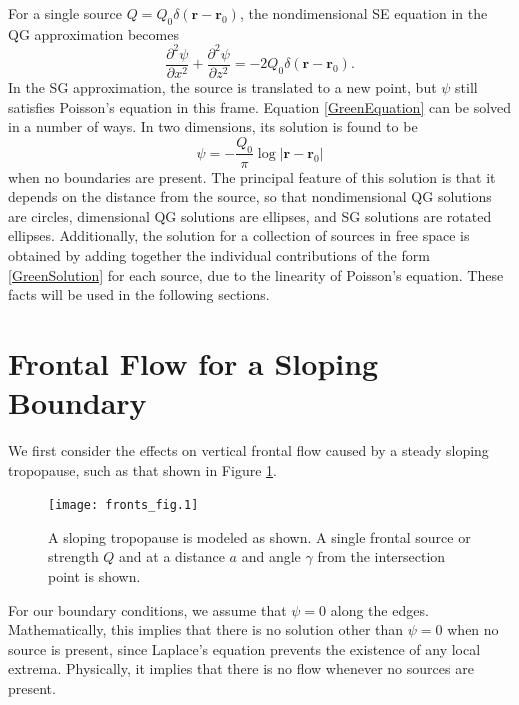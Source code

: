 \documentclass[11pt,onecolumn,oneside]{article}
\newcommand{\pdiff}[2]{\frac{\partial #1}{\partial #2}}
\begin{document}
For a single source $Q = Q_0 \delta(\mathbf{r} - \mathbf{r}_0)$, the nondimensional SE equation in the QG approximation becomes
\begin{equation}\label{GreenEquation}
\pdiff{^2 \psi}{x^2} + \pdiff{^2 \psi}{z^2} = -2Q_0 \delta(\mathbf{r} - \mathbf{r}_0).
\end{equation}
In the SG approximation, the source is translated to a new point, but $\psi$ still satisfies Poisson's equation in this frame. Equation \eqref{GreenEquation} can be solved in a number of ways. In two dimensions, its solution is found to be
\begin{equation}\label{GreenSolution}
\psi = -\frac{Q_0}{\pi} \log |\mathbf{r} - \mathbf{r}_0|
\end{equation}
when no boundaries are present. The principal feature of this solution is that it depends on the distance from the source, so that nondimensional QG solutions are circles, dimensional QG solutions are ellipses, and SG solutions are rotated ellipses. Additionally, the solution for a collection of sources in free space is obtained by adding together the individual contributions of the form \eqref{GreenSolution} for each source, due to the linearity of Poisson's equation. These facts will be used in the following sections.


\section{Frontal Flow for a Sloping Boundary}

We first consider the effects on vertical frontal flow caused by a steady sloping tropopause, such as that shown in Figure \ref{Fig:SlopedDomain}.
\begin{figure}[ht]
\centering
\texttt{[image: fronts\_fig.1]}
\caption{\small A sloping tropopause is modeled as shown. A single frontal source or strength $Q$ and at a distance $a$ and angle $\gamma$ from the intersection point is shown.}
\label{Fig:SlopedDomain}
\end{figure}
For our boundary conditions, we assume that $\psi = 0$ along the edges. Mathematically, this implies that there is no solution other than $\psi = 0$ when no source is present, since Laplace's equation prevents the existence of any local extrema. Physically, it implies that there is no flow whenever no sources are present.
\end{document}
